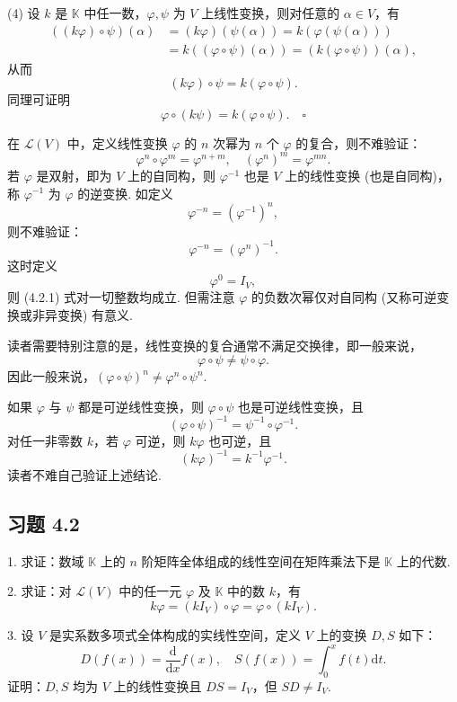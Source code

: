 \documentclass[UTF8,12pt,a4paper,fontset=fandol]{ctexart}
\begin{document}
(4) 设 $k$ 是 $\mathbb{K}$ 中任一数，$\varphi,\psi$ 为 $V$ 上线性变换，则对任意的 $\alpha\in V$，有
\[
\begin{aligned}
((k\varphi)\circ\psi)(\alpha)
&=(k\varphi)(\psi(\alpha))=k(\varphi(\psi(\alpha)))\\
&=k((\varphi\circ\psi)(\alpha))=(k(\varphi\circ\psi))(\alpha),
\end{aligned}
\]
从而
\[
(k\varphi)\circ\psi=k(\varphi\circ\psi).
\]
同理可证明
\[
\varphi\circ(k\psi)=k(\varphi\circ\psi). \quad \square
\]

在 $\mathcal{L}(V)$ 中，定义线性变换 $\varphi$ 的 $n$ 次幂为 $n$ 个 $\varphi$ 的复合，则不难验证：
\begin{equation}
\varphi^n\circ\varphi^m=\varphi^{n+m},\quad (\varphi^n)^m=\varphi^{mn}.
\tag{4.2.1}
\end{equation}
若 $\varphi$ 是双射，即为 $V$ 上的自同构，则 $\varphi^{-1}$ 也是 $V$ 上的线性变换 (也是自同构)，称 $\varphi^{-1}$ 为 $\varphi$ 的逆变换. 如定义
\[
\varphi^{-n}=(\varphi^{-1})^n,
\]
则不难验证：
\begin{equation}
\varphi^{-n}=(\varphi^n)^{-1}.
\tag{4.2.2}
\end{equation}
这时定义
\[
\varphi^0=I_V,
\]
则 (4.2.1) 式对一切整数均成立. 但需注意 $\varphi$ 的负数次幂仅对自同构 (又称可逆变换或非异变换) 有意义.

读者需要特别注意的是，线性变换的复合通常不满足交换律，即一般来说，
\[
\varphi\circ\psi\neq\psi\circ\varphi.
\]
因此一般来说，$(\varphi\circ\psi)^n\neq\varphi^n\circ\psi^n$.

如果 $\varphi$ 与 $\psi$ 都是可逆线性变换，则 $\varphi\circ\psi$ 也是可逆线性变换，且
\[
(\varphi\circ\psi)^{-1}=\psi^{-1}\circ\varphi^{-1}.
\]
对任一非零数 $k$，若 $\varphi$ 可逆，则 $k\varphi$ 也可逆，且
\[
(k\varphi)^{-1}=k^{-1}\varphi^{-1}.
\]
读者不难自己验证上述结论.

\subsection*{习题 4.2}

1. 求证：数域 $\mathbb{K}$ 上的 $n$ 阶矩阵全体组成的线性空间在矩阵乘法下是 $\mathbb{K}$ 上的代数.

2. 求证：对 $\mathcal{L}(V)$ 中的任一元 $\varphi$ 及 $\mathbb{K}$ 中的数 $k$，有
\[
k\varphi=(kI_V)\circ\varphi=\varphi\circ(kI_V).
\]

3. 设 $V$ 是实系数多项式全体构成的实线性空间，定义 $V$ 上的变换 $D,S$ 如下：
\[
D(f(x))=\frac{\mathrm{d}}{\mathrm{d}x}f(x),\quad S(f(x))=\int_0^x f(t)\mathrm{d}t.
\]
证明：$D,S$ 均为 $V$ 上的线性变换且 $DS=I_V$，但 $SD\neq I_V$.
\end{document}
